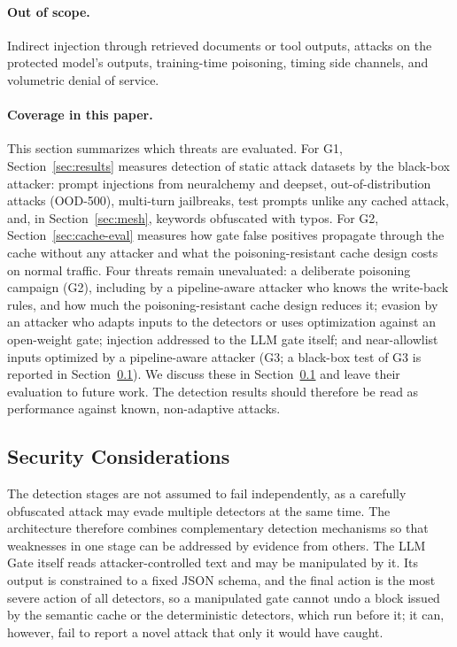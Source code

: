 \documentclass[runningheads]{llncs}
\newif\ifrev
\newcommand{\rev}[1]{\ifrev\hl{#1}\else#1\fi}                  %
\begin{document}
\paragraph{\protect\rev{Out of scope.}}
\rev{Indirect injection through retrieved documents or tool outputs, attacks on the protected model's outputs, training-time poisoning, timing side channels, and volumetric denial of service.}

\paragraph{\protect\rev{Coverage in this paper.}}
\rev{This section summarizes which threats are evaluated. For G1, Section~\ref{sec:results} measures detection of static attack datasets by the black-box attacker: prompt injections from neuralchemy and deepset, out-of-distribution attacks (OOD-500), multi-turn jailbreaks, test prompts unlike any cached attack, and, in Section~\ref{sec:mesh}, keywords obfuscated with typos. For G2, Section~\ref{sec:cache-eval} measures how gate false positives propagate through the cache without any attacker and what the poisoning-resistant cache design costs on normal traffic. Four threats remain unevaluated: a deliberate poisoning campaign (G2), including by a pipeline-aware attacker who knows the write-back rules, and how much the poisoning-resistant cache design reduces it; evasion by an attacker who adapts inputs to the detectors or uses optimization against an open-weight gate; injection addressed to the LLM gate itself; and near-allowlist inputs optimized by a pipeline-aware attacker (G3; a black-box test of G3 is reported in Section~\ref{sec:security}). We discuss these in Section~\ref{sec:security} and leave their evaluation to future work. The detection results should therefore be read as performance against known, non-adaptive attacks.}

\subsection{Security Considerations}\label{sec:security}
The detection stages are not assumed to fail independently, as a
carefully obfuscated attack may evade multiple detectors at the same
time. The architecture therefore combines complementary detection
mechanisms so that weaknesses in one stage can be addressed by
evidence from others. \rev{The LLM Gate itself reads attacker-controlled text and may be manipulated by it. Its output is constrained to a fixed JSON schema, and the final action is the most severe action of all detectors, so a manipulated gate cannot undo a block issued by the semantic cache or the deterministic detectors, which run before it; it can, however, fail to report a novel attack that only it would have caught.}
\end{document}
